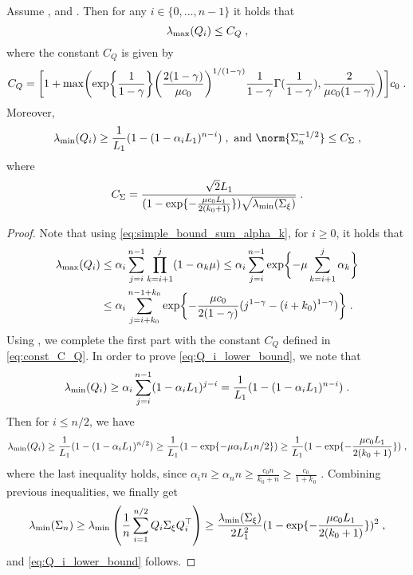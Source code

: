 \begin{lemma}
\label{lem:bound_Q_i_and_Sigma_n}
Assume , and . Then for any $i \in \{0, \ldots, n-1\}$ it holds that
\begin{equation}
\lambda_{\max}(Q_i) \leq C_Q\;,
\end{equation}
where the constant $C_Q$ is given by \begin{equation}
\label{eq:const_C_Q}
    C_Q =\biggl[1+\max\biggl(\exp\biggl\{\frac{1}{1-\gamma}\biggr\}\biggl(\frac{2(1-\gamma)}{\mu c_0}\biggr)^{1/(1-\gamma)}\frac{1}{1-\gamma}\Gamma(\frac{1}{1-\gamma}), \frac{2}{\mu c_0(1-\gamma)}\biggr)\biggr]c_0\;.
\end{equation}
Moreover,
\begin{equation}
\label{eq:Q_i_lower_bound}
\lambda_{\min}(Q_i) \geq \frac{1}{L_1}(1-(1-\alpha_i L_1)^{n-i})\eqsp, \text{ and } \norm{\Sigma_n^{-1/2}} \leq C_{\Sigma}\eqsp,
\end{equation}
where 
\begin{equation}
\label{eq:def_C_Sigma}
C_{\Sigma} = \frac{\sqrt{2}L_1}{(1-\exp\{-\frac{\mu c_0L_1}{2(k_0+1)}\})\sqrt{\lambda_{\min}(\Sigma_{\xi})}}\;.
\end{equation}
\end{lemma}
\begin{proof}
Note that using \ref{eq:simple_bound_sum_alpha_k}, for $i \geq 0$, it holds that 
\begin{align}
\lambda_{\max}(Q_i) 
&\leq \alpha_i\sum_{j=i}^{n-1}\prod_{k=i+1}^{j}(1-\alpha_k \mu) \leq \alpha_i\sum_{j=i}^{n-1}\exp\biggl\{-\mu\sum_{k=i+1}^j\alpha_k\biggr\} \\
&\leq \alpha_i\sum_{j=i+k_0}^{n-1+k_0}\exp\biggl\{-\frac{\mu c_0}{2(1-\gamma)}(j^{1-\gamma}-(i+k_0)^{1-\gamma})\biggr\}\;.
\end{align} 
Using , we complete the first part with the constant $C_Q$ defined in \eqref{eq:const_C_Q}. In order to prove \eqref{eq:Q_i_lower_bound}, we note that 
\begin{equation}
     \lambda_{\min}(Q_i) \geq \alpha_i\sum_{j=i}^{n-1}(1-\alpha_i L_1)^{j-i} =\frac{1}{L_1}(1-(1-\alpha_i L_1)^{n-i})\;.
\end{equation}
Then for $i \leq n/2$, we have 
\begin{equation}
    \lambda_{\min}(Q_i) \geq \frac{1}{L_1}(1-(1-\alpha_i L_1)^{n/2})\geq \frac{1}{L_1}(1-\exp\{-\mu\alpha_i L_1 n/2\}) \geq \frac{1}{L_1}(1-\exp\{-\frac{\mu c_0L_1}{2(k_0+1)}\})\;,
\end{equation}
where the last inequality holds, since $\alpha_i n \geq \alpha_n n \geq \frac{c_0 n}{k_0 + n} \geq \frac{c_0}{1+k_0}$ .
Combining previous inequalities, we finally get 
\begin{equation}
\lambda_{\min}(\Sigma_n) \geq \lambda_{\min}\left(\frac{1}{n}\sum_{i=1}^{n/2}Q_i\Sigma_{\xi}Q_i^\top\right) \geq \frac{\lambda_{\min}(\Sigma_{\xi})}{2 L_1^2}(1-\exp\{-\frac{\mu c_0L_1}{2(k_0+1)}\})^2\;,
\end{equation}
and \eqref{eq:Q_i_lower_bound} follows. 
\end{proof}

